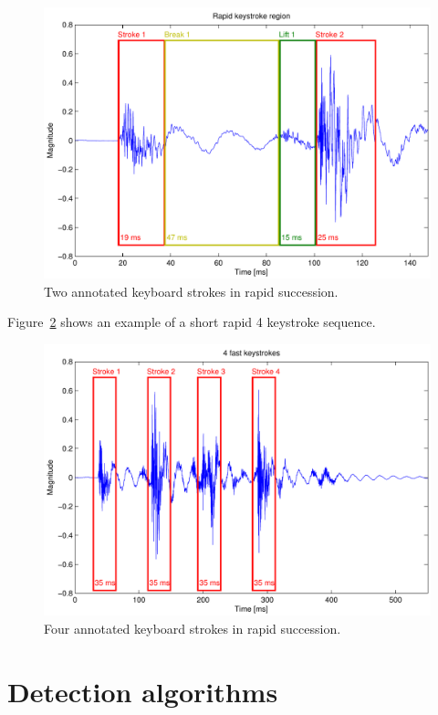 \begin{figure}[!] %
\centering
\includegraphics[width=120mm]{Keyboard2StrokesFast.pdf}
\caption{Two annotated keyboard strokes in rapid succession.}\label{fig:Keyboard2StrokesFast}
\end{figure}

Figure~\ref{fig:Keyboard4StrokesFast} shows an example of a short rapid 4 keystroke sequence.

\begin{figure}[!] %
\centering
\includegraphics[width=120mm]{Keyboard4StrokesFast.pdf}
\caption{Four annotated keyboard strokes in rapid succession.}\label{fig:Keyboard4StrokesFast}
\end{figure}

\section{Detection algorithms}\label{sec:WPdetection}


